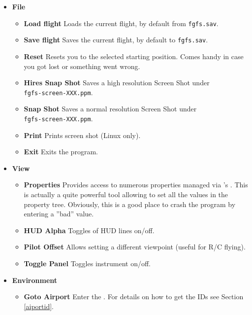 \begin{itemize}
 \item \textbf{File}
 \begin{itemize}
 \item \textbf{Load flight} Loads the current flight, by default from \texttt{fgfs.sav}.
  \item \textbf{Save flight} Saves the current flight, by default to \texttt{fgfs.sav}.
 \item \textbf{Reset} Resets you to the selected starting position. Comes handy in case you got lost or something went wrong.
\item \textbf{Hires Snap Shot} Saves a high resolution Screen Shot under\\ \texttt{fgfs-screen-XXX.ppm}.
  \item \textbf{Snap Shot} Saves a normal resolution Screen Shot under\\ \texttt{fgfs-screen-XXX.ppm}.
  \item \textbf{Print} Prints screen shot (Linux only).
  \item \textbf{Exit} Exits the program.
 \end{itemize}

 \item \textbf{View}
 \begin{itemize}
  \item \textbf{Properties} Provides access to numerous properties managed via \FlightGear{}'s . This is actually a quite powerful tool allowing to set all the values in the property tree. Obviously, this is a good place to crash the program by entering a ''bad'' value.
 \item \textbf{HUD Alpha} Toggles  of HUD lines on/off.
 \item \textbf{Pilot Offset} Allows setting a different viewpoint (useful for R/C flying).
 \item \textbf{Toggle Panel} Toggles instrument  on/off.
 \end{itemize}
 
\item \textbf{Environment}
 \begin{itemize}
 \item \textbf{Goto Airport} Enter the . For details on how to get the IDs
  see Section \ref{aiportid}.
 \end{itemize}


\end{itemize}
